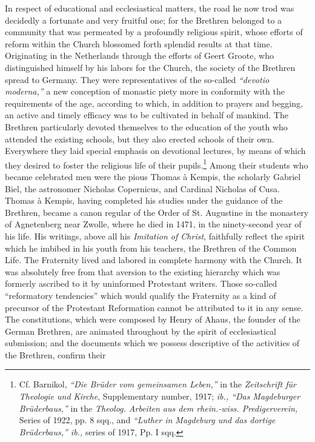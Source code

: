 In respect of educational and ecclesiastical matters, the road he
now trod was decidedly a fortunate and very fruitful one; for the
Brethren belonged to a community that was permeated by a profoundly religious spirit, whose efforts of reform within the Church
blossomed forth splendid results at that time. Originating in the
Netherlands through the efforts of Geert Groote, who distinguished
himself by his labors for the Church, the society of the Brethren
spread to Germany. They were representatives of the so-called
\textit{“devotio moderna,”} a new conception of monastic piety more in
conformity with the requirements of the age, according to which,
in addition to prayers and begging, an active and timely efficacy
was to be cultivated in behalf of mankind. The Brethren particularly
devoted themselves to the education of the youth who attended the
existing schools, but they also erected schools of their own. Everywhere they laid special emphasis on devotional lectures, by means of
which they desired to foster the religious life of their pupils.\footnote{Cf. Barnikol, \textit{``Die Brüder vom gemeinsamen Leben,''} in the \textit{Zeitschrift für Theologie
und Kirche}, Supplementary number, 1917; \textit{ib., “Das Magdeburger Brüderbaus,”} in the
\textit{Theolog. Arbeiten aus dem rhein.-wiss. Predigerverein,} Series of 1922, pp. 8 sqq., and
\textit{“Luther in Magdeburg und das dortige Brüderbaus,” ib.,} series of 1917, Pp. I sqq.
}
Among
their students who became celebrated men were the pious Thomas à
Kempis, the scholarly Gabriel Biel, the astronomer Nicholas Copernicus, and Cardinal Nicholas of Cusa. Thomas à Kempis, having
completed his studies under the guidance of the Brethren, became
a canon regular of the Order of St. Augustine in the monastery of
Agnetenberg near Zwolle, where he died in 1471, in the ninety-second year of his life.
His writings, above all his \textit{Imitation of Christ},
faithfully reflect the spirit which he imbibed in his youth from his
teachers, the Brethren of the Common Life. The Fraternity lived and
labored in complete harmony with the Church. It was absolutely
free from that aversion to the existing hierarchy which was formerly
ascribed to it by uninformed Protestant writers. Those so-called
“reformatory tendencies” which would qualify the Fraternity as a
kind of precursor of the Protestant Reformation cannot be attributed
to it in any sense. The constitutions, which were composed by Henry
of Ahaus, the founder of the German Brethren, are animated throughout by the spirit of ecclesiastical submission; and the documents which
we possess descriptive of the activities of the Brethren, confirm their
